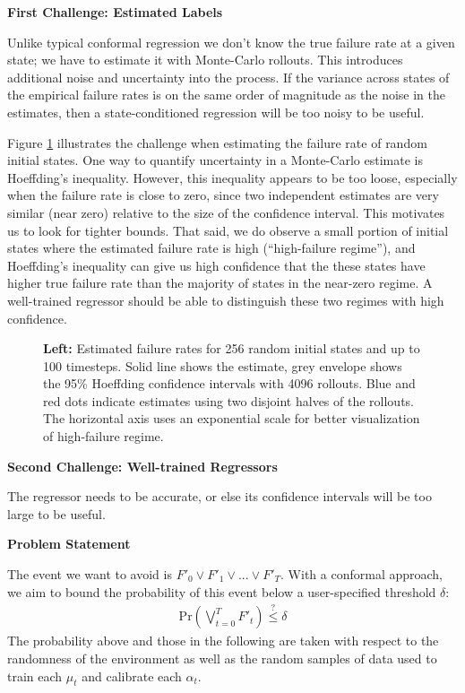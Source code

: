 \documentclass[12pt,letterpaper]{article}
\begin{document}
\textbf{First Challenge: Estimated Labels}

Unlike typical conformal regression we don't know the true failure rate at a given state; we have to estimate it with Monte-Carlo rollouts.  This introduces additional noise and uncertainty into the process.  If the variance across states of the empirical failure rates is on the same order of magnitude as the noise in the estimates, then a state-conditioned regression will be too noisy to be useful.

Figure \ref{fig:failest} illustrates the challenge when estimating the failure rate of random initial states.  One way to quantify uncertainty in a Monte-Carlo estimate is Hoeffding's inequality.  However, this inequality appears to be too loose, especially when the failure rate is close to zero, since two independent estimates are very similar (near zero) relative to the size of the confidence interval.  This motivates us to look for tighter bounds.  That said, we do observe a small portion of initial states where the estimated failure rate is high (``high-failure regime''), and Hoeffding's inequality can give us high confidence that the these states have higher true failure rate than the majority of states in the near-zero regime.  A well-trained regressor should be able to distinguish these two regimes with high confidence.

\begin{figure}[htbp]
    \centering
    \caption{\textbf{Left:} Estimated failure rates for 256 random initial states and up to 100 timesteps.  Solid line shows the estimate, grey envelope shows the 95\% Hoeffding confidence intervals with 4096 rollouts. Blue and red dots indicate estimates using two disjoint halves of the rollouts.  The horizontal axis uses an exponential scale for better visualization of high-failure regime.}
    \label{fig:failest}
\end{figure}

\textbf{Second Challenge: Well-trained Regressors}

The regressor needs to be accurate, or else its confidence intervals will be too large to be useful.

\textbf{Problem Statement}

The event we want to avoid is $F'_0 \vee F'_1 \vee ... \vee F'_T$.  With a conformal approach, we aim to bound the probability of this event below a user-specified threshold $\delta$:
\begin{align}
\text{Pr}\left(\bigvee_{t=0}^T F'_t\right) \overset{?}{\leq} \delta\label{eq:problem}
\end{align}
The probability above and those in the following are taken with respect to the randomness of the environment as well as the random samples of data used to train each $\mu_t$ and calibrate each $\alpha_t$.
\end{document}

